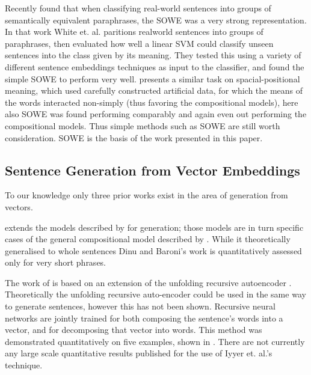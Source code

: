 \documentclass[11pt]{article}
\theoremstyle{plain}
\theoremstyle{definition}
\begin{document}
Recently \textcite{White2015SentVecMeaning} found that when classifying real-world sentences into groups of semantically equivalent paraphrases, the SOWE was a very strong representation. In that work White et. al. paritions realworld sentences into groups of paraphrases, then evaluated how well a linear SVM could classify unseen sentences into the class given by its meaning. They tested this using a variety of different sentence embeddings techniques as input to the classifier, and found the simple SOWE to perform very well. \textcite{RitterPosition} presents a similar task on spacial-positional meaning, which used carefully constructed artificial data, for which the means of the words interacted non-simply (thus favoring the compositional models), here also SOWE was found performing comparably and again even out performing the compositional models. Thus simple methods such as SOWE are still worth consideration. SOWE is the basis of the work presented in this paper.

\subsection{Sentence Generation from Vector Embeddings}

To our knowledge only three prior works exist in the area of generation from vectors.

\textcite{Dinu2014CompositionalGeneration}  extends the models described by \textcite{zanzotto2010estimating, Guevara2010} for generation; those models are in turn specific cases of the general compositional model described by \textcite{Mitchell2008}. While it theoretically generalised to whole sentences Dinu and Baroni's work is quantitatively assessed only for very short phrases.


The work of \textcite{iyyer2014generating} is based on an extension of the unfolding recursive autoencoder \textcite{SocherEtAl2011:PoolRAE}. Theoretically the unfolding recursive auto-encoder could be used in the same way to generate sentences, however this has not been shown. Recursive neural networks are jointly trained for both composing the sentence's words into a vector, and for decomposing that vector into words. This method was demonstrated quantitatively on five examples, shown in . There are not currently any large scale quantitative results published for the use of Iyyer et. al.'s technique.
\end{document}
